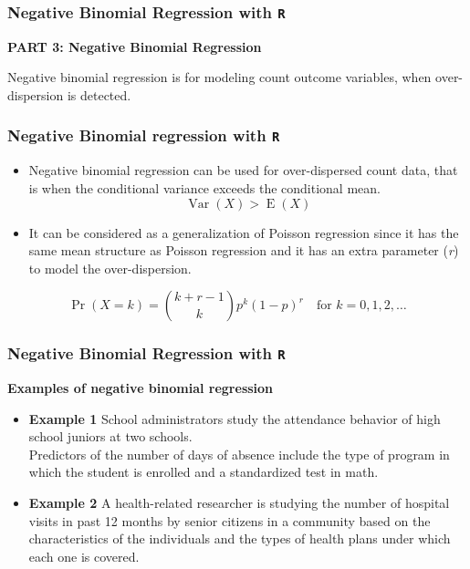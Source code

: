 \documentclass[MASTER.tex]{subfiles}
\begin{document}
\begin{frame}[fragile]
\frametitle{Negative Binomial Regression with \texttt{R}}
\Large
\textbf{PART 3: Negative Binomial Regression}

\bigskip
{
\Large
Negative binomial regression is for modeling count outcome variables, when over-dispersion is detected.
}
\end{frame}
\begin{frame}[fragile]
\frametitle{Negative Binomial regression with \texttt{R}}
\large	
\begin{itemize}
		\item Negative binomial regression can be used for over-dispersed count data, that is when the conditional 
		variance exceeds the conditional mean. 
		\[\operatorname{Var}(X) >  \operatorname{E}(X)\]
		\item It can be considered as a generalization of Poisson regression since it has the same mean structure as Poisson 	
		regression and it has an extra parameter (\textit{r}) to model the over-dispersion. 
\end{itemize}
\[\Pr(X = k) = {k+r-1 \choose k} p^k(1-p)^r \quad \mbox{for }k = 0, 1, 2, \dots \]
	
\end{frame}
\begin{frame}[fragile]
\frametitle{Negative Binomial Regression with \texttt{R} }
\large
\textbf{Examples of negative binomial regression}
\begin{itemize}
\item \textbf{Example 1}  School administrators study the attendance behavior of high school juniors at two schools. \\ Predictors of the number of days of absence include the type of program in which the student is enrolled and a standardized test in math.

\item \textbf{Example 2}  A health-related researcher is studying the number of hospital visits in past 12 months by senior citizens in a community based on the characteristics of the individuals and the types of health plans under which each one is covered.
\end{itemize}
\end{frame}
\end{document}
